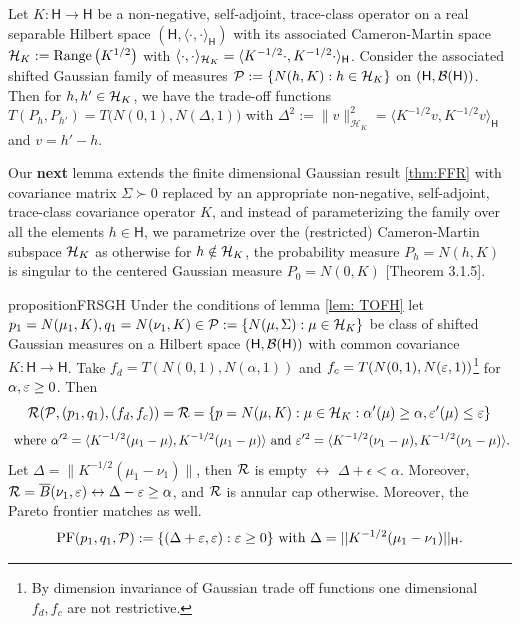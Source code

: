 \begin{lemma} \label{lem: TOFH}
    Let $K:\mathsf H \to \mathsf H$ be a non-negative, self-adjoint, trace-class operator on a real separable Hilbert space $(\mathsf H, \langle \cdot, \cdot \rangle_{\mathsf H})$ with its associated Cameron-Martin space $\mathcal{H}_K:= \text{Range} \left(K^{1/2}\right)$ with $\langle \cdot, \cdot\rangle_{\mathcal{H}_{K}}= \langle K^{-1/2} \cdot, K^{-1/2} \cdot \rangle_{\mathsf H} $. Consider the associated shifted Gaussian family of measures $\mathcal{P}:= \{N(h, K): h \in \mathcal{H}_K\}$ on $(\mathsf H, \mathcal{B}(\mathsf H))$. Then for $h,h'\in \mathcal{H}_{K}$, we have the trade-off functions $T(P_h,P_{h'})=  T\bigl(N(0,1),N(\Delta,1)\bigr)$ with $\Delta^2:=   \|v\|_{\mathcal H_K}^2= \langle K^{-1/2}v, K^{-1/2} v \rangle_{\mathsf H}  $ and $v=h'-h$.
\end{lemma}
Our \textbf{next} lemma extends the finite dimensional Gaussian result \ref{thm:FFR} with covariance matrix $\Sigma \succ 0$ replaced by an appropriate non-negative, self-adjoint, trace-class covariance operator $K$, and instead of parameterizing the family over all the elements $h\in \mathsf H$, we parametrize over the (restricted) Cameron-Martin subspace $\mathcal{H}_K$ as otherwise for $h \notin \mathcal{H}_K$,  the probability measure $P_h= N(h,K)$ is  singular to the centered Gaussian measure $P_0=N(0,K)$ \citet{lunardi2016infinite}[Theorem 3.1.5]. 
\begin{restatable}{proposition}{FRSGH}
\label{thm:FRSGH}
Under the conditions of lemma \ref{lem: TOFH} let $p_1 = N(\mu_1, K), q_1= N(\nu_1, K)\in \mathcal{P}:= \{N(\mu, \Sigma): \mu \in \mathcal{H}_{K}\}$ be class of shifted Gaussian measures on a Hilbert space $(\mathsf H, \mathcal{B}(\mathsf H))$ with common covariance $K:\mathsf H \to \mathsf H$. Take $f_d= T(N(0,1), N(\alpha, 1))$ and $f_c= T(N(0,1), N(\varepsilon,1))$\footnote{By dimension invariance of Gaussian trade off functions one dimensional $f_d,f_c$ are not restrictive.} for $\alpha, \varepsilon \geq 0$. Then  
\vspace{-2mm}
\begin{equation} \label{eq:GFRSGH}
\mathcal{R}(\mathcal{P}, (p_1,q_1), (f_d,f_c)) =
\mathcal{R}= \{p= N(\mu, K): \mu \in \mathcal{H}_{K}: \alpha'(\mu) \geq \alpha, \varepsilon'(\mu) \leq \varepsilon\} 
\end{equation}
\begin{equation} \label{eq:GFRparameters0SGH}
\text{ where } \alpha'^2= \langle K^{-1/2}(\mu_1 -\mu), K^{-1/2}(\mu_1-\mu) \rangle \text{ and }\varepsilon'^2= \langle K^{-1/2}(\nu_1 -\mu), K^{-1/2}(\nu_1-\mu) \rangle. 
\end{equation}
Let $\Delta= \|K^{-1/2}(\mu_1- \nu_1)\|$, then $\mathcal{R}$ is empty $\leftrightarrow$ $ \Delta + \epsilon <\alpha $. Moreover, $\mathcal{R}= \overline{B}(\nu_1, \varepsilon) \leftrightarrow \Delta - \varepsilon \geq \alpha $, and $\mathcal{R}$ is annular cap otherwise.  Moreover, the Pareto frontier matches as well.
\begin{equation} \label{eq:ParetoSGH}
    \text{PF}(p_1, q_1, \mathcal{P}) := \{(\Delta +\varepsilon, \varepsilon): \varepsilon \geq 0\} \text{ with } \Delta = ||K^{-1/2}(\mu_1- \nu_1)||_{\mathsf H}.
\end{equation}
\end{restatable}

